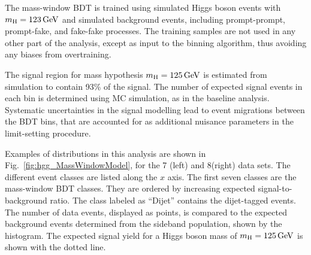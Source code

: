 \documentclass[12pt,twoside,a4paper,cmspaper,final,collab]{cms-tdr}
\begin{document}
The mass-window BDT is trained using simulated Higgs boson events with
$m_{\mathrm{H}}=123\,\text{Ge\hspace{-.08em}V}$ and simulated background events, including prompt-prompt,
prompt-fake, and fake-fake processes.
The training samples are not used in any other part of the analysis,
except as input to the binning algorithm, thus
avoiding any biases from overtraining.

The signal region for mass hypothesis $m_{\mathrm{H}}=125\,\text{Ge\hspace{-.08em}V}$
is estimated from simulation to contain 93\% of the signal.
The number of expected signal events in each bin is determined using MC simulation, as in the
baseline analysis. Systematic uncertainties in the signal modelling lead to
event migrations between the BDT  bins, that are accounted for as
additional nuisance parameters in the limit-setting procedure.


Examples of distributions in this analysis are shown in Fig.~\ref{fig:hgg_MassWindowModel},
for the 7 (left) and 8\TeV (right) data sets.
The different event classes are listed along the $x$ axis. The first seven classes
are the mass-window BDT classes.
They are ordered by increasing expected signal-to-background ratio.
The class labeled as ``Dijet'' contains the dijet-tagged events.
The number of data events, displayed as points, is compared to the expected background events determined from the sideband population,
shown by the histogram.
The expected signal yield for a Higgs boson mass of $m_{\mathrm{H}}=125\,\text{Ge\hspace{-.08em}V}$ is shown
with the dotted line.
\end{document}
